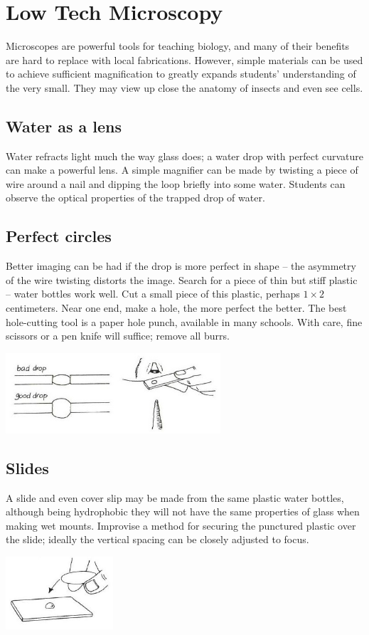 \chapter{Low Tech Microscopy} 
\label{cha:microscopy}
Microscopes are powerful tools for teaching biology, and many of their benefits are hard to replace with local fabrications. However, simple materials can be used to achieve sufficient magnification to greatly expands students' understanding of the very small. They may view up close the anatomy of insects and even see cells.

\section{Water as a lens}
Water refracts light much the way glass does; a water drop with perfect curvature can make a powerful lens. A simple magnifier can be made by twisting a piece of wire around a nail and dipping the loop briefly into some water. Students can observe the optical properties of the trapped drop of water.

\section{Perfect circles}
Better imaging can be had if the drop is more perfect in shape -- the asymmetry of the wire twisting distorts the image. Search for a piece of thin but stiff plastic -- water bottles work well. Cut a small piece of this plastic, perhaps $1 \times 2$ centimeters. Near one end, make a hole, the more perfect the better. The best hole-cutting tool is a paper hole punch, available in many schools. With care, fine scissors or a pen knife will suffice; remove all burrs.
\begin{center}
\includegraphics[width=8cm]{./img/vso/water-drop.jpg}
\end{center}

\section{Slides}
A slide and even cover slip may be made from the same plastic water bottles, although being hydrophobic they will not have the same properties of glass when making wet mounts. Improvise a method for securing the punctured plastic over the slide; ideally the vertical spacing can be closely adjusted to focus.
\begin{center}
\includegraphics[width=4cm]{./img/vso/slide-cover-slip.jpg}
\end{center}

